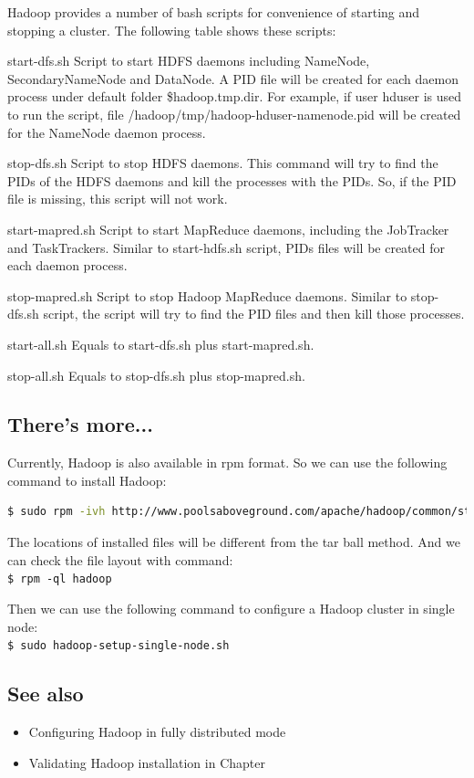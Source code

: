 Hadoop provides a number of bash scripts for convenience of starting and stopping a cluster. The following table shows these scripts:
\begin{description}
    \item{start-dfs.sh} Script to start HDFS daemons including NameNode, SecondaryNameNode and DataNode. A PID file will be created for each daemon process under default folder \${hadoop.tmp.dir}. For example, if user hduser is used to run the script, file /hadoop/tmp/hadoop-hduser-namenode.pid will be created for the NameNode daemon process.
    \item{stop-dfs.sh} Script to stop HDFS daemons. This command will try to find the PIDs of the HDFS daemons and kill the processes with the PIDs. So, if the PID file is missing, this script will not work.
    \item{start-mapred.sh} Script to start MapReduce daemons, including the JobTracker and TaskTrackers. Similar to start-hdfs.sh script, PIDs files will be created for each daemon process.
    \item{stop-mapred.sh} Script to stop Hadoop MapReduce daemons. Similar to stop-dfs.sh script, the script will try to find the PID files and then kill those processes.
    \item{start-all.sh} Equals to start-dfs.sh plus start-mapred.sh.
    \item{stop-all.sh} Equals to stop-dfs.sh plus stop-mapred.sh.
\end{description}
\subsection*{There's more...}
Currently, Hadoop is also available in rpm format. So we can use the following command to install Hadoop:
\lstset{style=bashstyle}
\begin{lstlisting}[language=bash]
$ sudo rpm -ivh http://www.poolsaboveground.com/apache/hadoop/common/stable/hadoop-1.1.2-1.x86_64.rpm
\end{lstlisting}

The locations of installed files will be different from the tar ball method. And we can check the file layout with command: \\
\verb|$ rpm -ql hadoop|

Then we can use the following command to configure a Hadoop cluster in single node: \\
\verb|$ sudo hadoop-setup-single-node.sh|
\subsection*{See also}
\begin{itemize}
  \item Configuring Hadoop in fully distributed mode
  \item Validating Hadoop installation in Chapter
\end{itemize}

